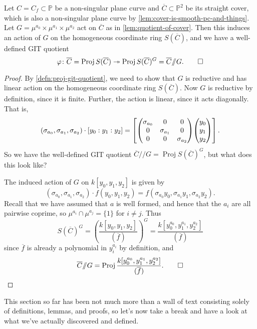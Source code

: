 \documentclass[10pt,notitlepage]{article}
\numberwithin{equation}{subsection}
\DeclareMathOperator{\proj}{Proj}
\newcommand{\pee}{\mathbb{P}}
\newcommand{\cover}[1]{\overline{#1}}
\newcommand{\sslash}{/\!\!/}
\begin{document}
        \begin{lemma}\label{lem:git-quotient-exists}
            Let $C=C_f\subset\pee$ be a non-singular plane curve and $\cover{C}\subset\pee^2$ be its straight cover, which is also a non-singular plane curve by \cref{lem:cover-is-smooth-pc-and-things}.
            Let $G=\mu^{a_0}\times\mu^{a_1}\times\mu^{a_2}$ act on $\cover{C}$ as in \cref{lem:quotient-of-cover}.
            Then this induces an action of $G$ on the homogeneous coordinate ring $S(\cover{C})$, and we have a well-defined GIT quotient
            \[
                \varphi\colon\cover{C}=\proj S(\cover{C})\twoheadrightarrow\proj S(\cover{C})^G=\cover{C}\sslash G.\qedhere
            \]
        \end{lemma}

        \begin{proof}
            By \cref{defn:proj-git-quotient}, we need to show that $G$ is reductive and has linear action on the homogeneous coordinate ring $S(\cover{C})$.
            Now $G$ is reductive by definition, since it is finite.
            Further, the action is linear, since it acts diagonally.
            That is,
            \[
                (\sigma_{a_0},\sigma_{a_1},\sigma_{a_2})\cdot[y_0:y_1:y_2] = \left[\mqty(\dmat[0]{\sigma_{a_0},\sigma_{a_1},\sigma_{a_2}})\mqty(y_0\\y_1\\y_2)\right].
            \]
            So we have the well-defined GIT quotient $\cover{C}\sslash G = \proj S(\cover{C})^G$, but what does this look like?

            The induced action of $G$ on $k[y_0,y_1,y_2]$ is given by
            \[
                (\sigma_{a_0},\sigma_{a_1},\sigma_{a_2})\cdot f(y_0,y_1,y_2) = f(\sigma_{a_0}y_0,\sigma_{a_1}y_1,\sigma_{a_2}y_2).
            \]
            Recall that we have assumed that $a$ is well formed, and hence that the $a_i$ are all pairwise coprime, so $\mu^{a_i}\cap\mu^{a_j}=\{1\}$ for $i\neq j$.
            Thus
            \[
                S(\cover{C})^G = \left(\frac{k[y_0,y_1,y_2]}{(\cover{f})}\right)^G = \frac{k[y_0^{a_0},y_1^{a_1},y_2^{a_2}]}{(\cover{f})}
            \]
            since $\cover{f}$ is already a polynomial in $y_i^{a_i}$ by definition, and
            \[
                \cover{C}\sslash G = \proj \frac{k[y_0^{a_0},y_1^{a_1},y_2^{a_2}]}{(\cover{f})}.\qedhere
            \]
        \end{proof}

        This section so far has been not much more than a wall of text consisting solely of definitions, lemmas, and proofs, so let's now take a break and have a look at what we've actually discovered and defined.
\end{document}
